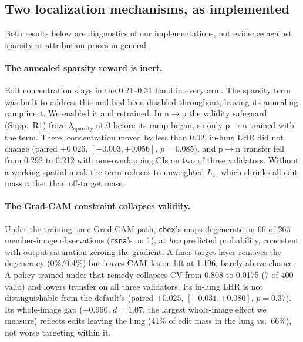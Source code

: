 \subsection{Two localization mechanisms, as implemented}
\label{sec:negative-results}

Both results below are diagnostics of our implementations, not evidence against sparsity or attribution priors in general.

\paragraph{The annealed sparsity reward is inert.} Edit concentration stays in the 0.21--0.31 band in every arm. The sparsity term was built to address this and had been disabled throughout, leaving its annealing ramp inert. We enabled it and retrained. In n$\to$p the validity safeguard (Supp.~R1) froze $\lambda_{\text{sparsity}}$ at 0 before its ramp began, so only p$\to$n trained with the term. There, concentration moved by less than 0.02, in-lung LHR did not change (paired $+0.026$, $[-0.003, +0.056]$, $p=0.085$), and p$\to$n transfer fell from 0.292 to 0.212 with non-overlapping CIs on two of three validators. Without a working spatial mask the term reduces to unweighted $L_1$, which shrinks all edit mass rather than off-target mass.

\paragraph{The Grad-CAM constraint collapses validity.} Under the training-time Grad-CAM path, \texttt{chex}'s maps degenerate on 66 of 263 member-image observations (\texttt{rsna}'s on 1), at \emph{low} predicted probability, consistent with output saturation zeroing the gradient. A finer target layer removes the degeneracy (0\%/0.4\%) but leaves CAM--lesion lift at 1.196, barely above chance. A policy trained under that remedy collapses CV from 0.808 to 0.0175 (7 of 400 valid) and lowers transfer on all three validators. Its in-lung LHR is not distinguishable from the default's (paired $+0.025$, $[-0.031, +0.080]$, $p=0.37$). Its whole-image gap ($+0.960$, $d=1.07$, the largest whole-image effect we measure) reflects edits leaving the lung (41\% of edit mass in the lung vs.\ 66\%), not worse targeting within it.
